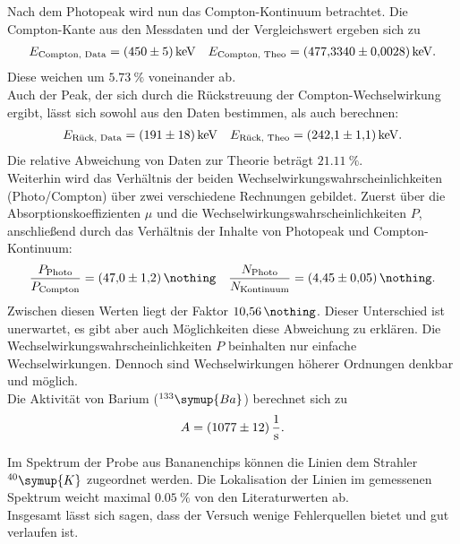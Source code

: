 Nach dem Photopeak wird nun das Compton-Kontinuum betrachtet.
Die Compton-Kante aus den Messdaten und der Vergleichswert ergeben sich zu
\begin{align*}
	E_{\text{Compton, Data}} = \SI{450 (5)}{\kilo \electronvolt} && E_{\text{Compton, Theo}} = \SI{477.3340 (28)}{\kilo \electronvolt}.
\end{align*}
Diese weichen um $\SI{5.73}{\%}$ voneinander ab.\\

Auch der Peak, der sich durch die Rückstreuung der Compton-Wechselwirkung ergibt, lässt sich sowohl aus den Daten bestimmen, als auch berechnen:
\begin{align*}
	E_{\text{Rück, Data}} = \SI{191 (18)}{\kilo \electronvolt} && E_{\text{Rück, Theo}} = \SI{242.1(11)}{\kilo \electronvolt}.
\end{align*}
Die relative Abweichung von Daten zur Theorie beträgt $\SI{21.11}{\%}$.\\

Weiterhin wird das Verhältnis der beiden Wechselwirkungswahrscheinlichkeiten (Photo/Compton) über zwei verschiedene Rechnungen gebildet.
Zuerst über die Absorptionskoeffizienten $\mu$ und die Wechselwirkungswahrscheinlichkeiten $P$, anschließend durch das Verhältnis der Inhalte von Photopeak und Compton-Kontinuum:
\begin{align*}
	\frac{ P_{\text{Photo} } }{ P_{ \text{Compton} } } = \SI{47.0 (12)}{\nothing} && 	\frac{ N_{\text{Photo}} }{ N_{\text{Kontinuum}} } = \SI{4.45 (5)}{\nothing}.
\end{align*}
Zwischen diesen Werten liegt der Faktor $\SI{10.56}{\nothing}$.
Dieser Unterschied ist unerwartet, es gibt aber auch Möglichkeiten diese Abweichung zu erklären.
Die Wechselwirkungswahrscheinlichkeiten $P$ beinhalten nur einfache Wechselwirkungen.
Dennoch sind Wechselwirkungen höherer Ordnungen denkbar und möglich.\\

Die Aktivität von Barium ($^{133}\symup{Ba}$) berechnet sich zu
\begin{equation*}
    A = \SI{1077 (12)}{\frac{1}{s}}.
\end{equation*}

Im Spektrum der Probe aus Bananenchips können die Linien dem Strahler $^{40}\symup{K}$ zugeordnet werden.
Die Lokalisation der Linien im gemessenen Spektrum weicht maximal $\SI{0.05}{\%}$ von den Literaturwerten ab.\\
Insgesamt lässt sich sagen, dass der Versuch wenige Fehlerquellen bietet und gut verlaufen ist.
